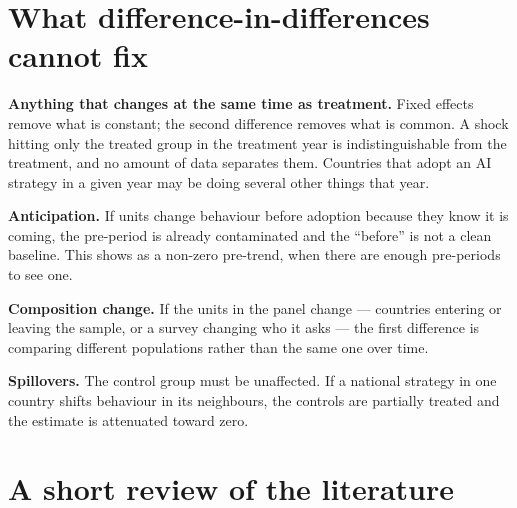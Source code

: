 \documentclass[
  letterpaper,
  10pt,
  twoside,
  openright,
  numbers=noenddot,
  chapterprefix=true]{scrbook}
\begin{document}
\section{What difference-in-differences cannot
fix}\label{what-difference-in-differences-cannot-fix}

\textbf{Anything that changes at the same time as treatment.} Fixed
effects remove what is constant; the second difference removes what is
common. A shock hitting only the treated group in the treatment year is
indistinguishable from the treatment, and no amount of data separates
them. Countries that adopt an AI strategy in a given year may be doing
several other things that year.

\textbf{Anticipation.} If units change behaviour before adoption because
they know it is coming, the pre-period is already contaminated and the
``before'' is not a clean baseline. This shows as a non-zero pre-trend,
when there are enough pre-periods to see one.

\textbf{Composition change.} If the units in the panel change ---
countries entering or leaving the sample, or a survey changing who it
asks --- the first difference is comparing different populations rather
than the same one over time.

\textbf{Spillovers.} The control group must be unaffected. If a national
strategy in one country shifts behaviour in its neighbours, the controls
are partially treated and the estimate is attenuated toward zero.

\section{A short review of the
literature}\label{a-short-review-of-the-literature-9}
\end{document}
